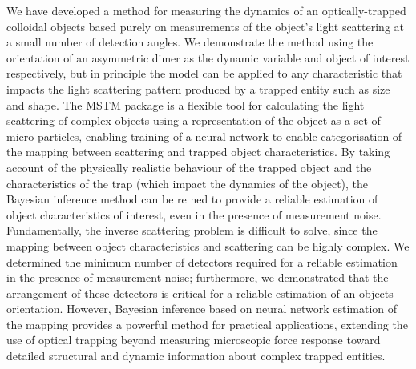 We have developed a method for measuring the dynamics of an optically-trapped colloidal objects based purely on measurements of the object's light scattering at a small number of detection angles. We demonstrate the method using the orientation of an asymmetric dimer as the dynamic variable and object of interest respectively, but in principle the model can be applied to any characteristic that impacts the light scattering pattern produced by a trapped entity such as size and shape. The MSTM package is a flexible tool for calculating the light scattering of complex objects using a representation of the object as a set of micro-particles, enabling training of a neural network to enable categorisation of the mapping between scattering and trapped object characteristics. By taking account of the physically realistic behaviour of the trapped object and the characteristics of the trap (which impact the dynamics of the object), the Bayesian inference method can be re ned to provide a reliable estimation of object characteristics of interest, even in the presence of measurement noise. Fundamentally, the inverse scattering problem is difficult to solve, since the mapping between object characteristics and scattering can be highly complex. We determined the minimum number of detectors required for a reliable estimation in the presence of measurement noise; furthermore, we demonstrated that the arrangement of these detectors is critical for a reliable estimation of an objects orientation. However, Bayesian inference based on neural network estimation of the mapping provides a powerful method for practical applications, extending the use of optical trapping beyond measuring microscopic force response toward detailed structural and dynamic information about complex trapped entities. 
